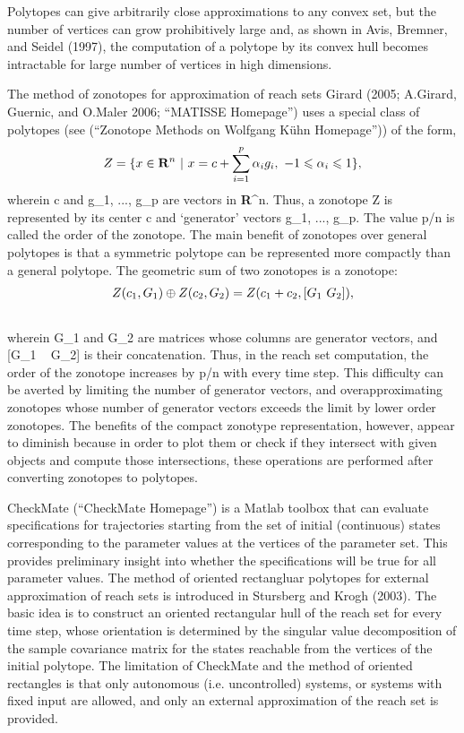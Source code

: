 \documentclass[letterpaper,10pt,english]{sphinxmanual}
\begin{document}
Polytopes can give arbitrarily close approximations to any convex set,
but the number of vertices can grow prohibitively large and, as shown in
Avis, Bremner, and Seidel (1997), the computation of a polytope by its
convex hull becomes intractable for large number of vertices in high
dimensions.

The method of zonotopes for approximation of reach sets Girard (2005;
A.Girard, Guernic, and O.Maler 2006; “MATISSE Homepage”) uses a special
class of polytopes (see (“Zonotope Methods on Wolfgang Kühn Homepage”))
of the form,
\begin{gather}
\begin{split}Z=\{x \in {\bf R}^n ~|~
x=c+\sum_{i=1}^p\alpha_ig_i,~ -1\leqslant\alpha_i\leqslant1\},\end{split}\notag
\end{gather}
wherein c and g_1, ..., g_p are vectors in
{\bf R}^n. Thus, a zonotope Z is represented by its
center c and ‘generator’ vectors g_1, ..., g_p. The
value p/n is called the order of the zonotope. The main benefit
of zonotopes over general polytopes is that a symmetric polytope can be
represented more compactly than a general polytope. The geometric sum of
two zonotopes is a zonotope:
\begin{gather}
\begin{split}Z(c_1, G_1)\oplus Z(c_2, G_2) = Z(c_1+c_2, [G_1 ~ G_2]),\end{split}\notag\\\begin{split}\end{split}\notag
\end{gather}
wherein G_1 and G_2 are matrices whose columns are
generator vectors, and [G_1 ~ G_2] is their concatenation. Thus,
in the reach set computation, the order of the zonotope increases by
p/n with every time step. This difficulty can be averted by
limiting the number of generator vectors, and overapproximating
zonotopes whose number of generator vectors exceeds the limit by lower
order zonotopes. The benefits of the compact zonotype representation,
however, appear to diminish because in order to plot them or check if
they intersect with given objects and compute those intersections, these
operations are performed after converting zonotopes to polytopes.

CheckMate (“CheckMate Homepage”) is a Matlab toolbox that can evaluate
specifications for trajectories starting from the set of initial
(continuous) states corresponding to the parameter values at the
vertices of the parameter set. This provides preliminary insight into
whether the specifications will be true for all parameter values. The
method of oriented rectangluar polytopes for external approximation of
reach sets is introduced in Stursberg and Krogh (2003). The basic idea
is to construct an oriented rectangular hull of the reach set for every
time step, whose orientation is determined by the singular value
decomposition of the sample covariance matrix for the states reachable
from the vertices of the initial polytope. The limitation of CheckMate
and the method of oriented rectangles is that only autonomous (i.e.
uncontrolled) systems, or systems with fixed input are allowed, and only
an external approximation of the reach set is provided.
\end{document}
